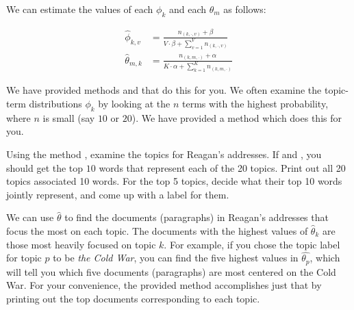 We can estimate the values of each $\phi_{k}$ and each $\theta_{m}$ as follows:

\begin{align*}
    \widehat{\phi}_{k,v} & = \frac{n_{(k,\cdot,v)} + \beta}{V \cdot \beta + \sum_{v=1}^{V} n_{(k,\cdot,v)}} \\
    \widehat{\theta}_{m,k} & = \frac{n_{(k,m,\cdot)} + \alpha}{K \cdot \alpha + \sum_{k=1}^{K} n_{(k,m,\cdot)}}
\end{align*}

We have provided methods  and  that do this for you. We often examine the topic-term distributions $\phi_{k}$ by looking at the $n$ terms with the highest probability, where $n$ is small (say $10$ or $20$).
We have provided a method  which does this for you.

\begin{problem}
Using the method , examine the topics for Reagan's addresses. 
If  and , you should get the top $10$ words that represent each of the 20 topics.
Print out all 20 topics associated 10 words. 
For the top 5 topics, decide what their top 10 words jointly represent, and come up with a label for them.
\end{problem}

We can use $\widehat{\theta}$ to find the documents (paragraphs) in Reagan's addresses that focus the most on each topic. The documents with the highest values of $\widehat{\theta}_{k}$ are those most heavily focused on topic $k$.
For example, if you chose the topic label for topic $p$ to be \emph{the Cold War}, you can find the five highest values in $\widehat{\theta_{p}}$, which will tell you which five documents (paragraphs) are most centered on the Cold War.
For your convenience, the provided method  accomplishes just that by printing out the top  documents corresponding to each topic.

